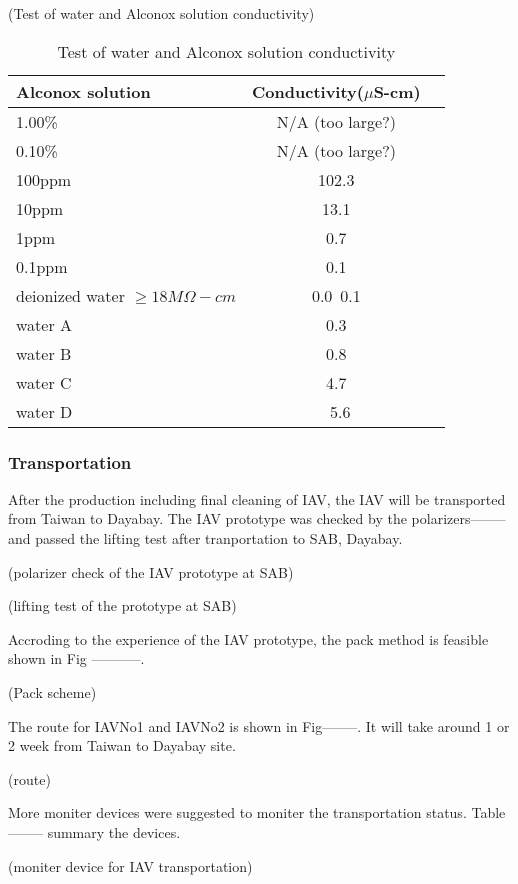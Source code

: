 (Test of water and Alconox solution conductivity)
\begin{table}
\centering
\caption{Test of water and Alconox solution conductivity}
\label{tab:AlconoxConductivity}
\begin{tabular}{lcp{5.0cm}}
Alconox solution &   Conductivity($\mu$S-cm) \\
\hline
\hline
1.00\% &  N/A (too large?)\\
\hline
0.10\% &  N/A (too large?)\\
\hline
100ppm & 102.3\\
\hline
10ppm  & 13.1\\
\hline
1ppm   & 0.7\\
\hline
0.1ppm & 0.1\\
\hline
deionized water $\geq 18M\Omega-cm$ &0.0~0.1\\
\hline
water A &0.3\\
\hline
water B &0.8\\
\hline
water C &4.7\\
\hline
water D &~5.6\\
\hline
\end{tabular}
\end{table}


\subsubsection {Transportation}

After the production including final cleaning of IAV, the IAV will be
transported from Taiwan to Dayabay.
The IAV prototype was checked by the polarizers-------- and passed
the lifting test after tranportation to SAB, Dayabay.


(polarizer check of the IAV prototype at SAB)




(lifting test of the prototype at SAB)


Accroding to the experience of the IAV
prototype, the pack method is feasible shown in Fig -----------.


(Pack scheme)


The route for IAVNo1 and IAVNo2 is shown in Fig--------.
It will take around 1 or 2 week from Taiwan to Dayabay site.


(route)


More moniter devices were suggested to moniter the transportation
status. Table-------- summary the devices.


(moniter device for IAV transportation)


